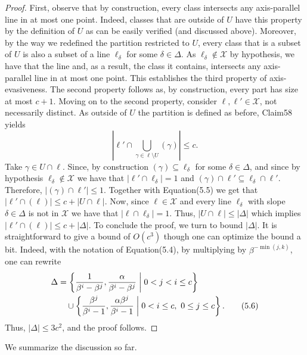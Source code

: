 \documentclass[10pt,a4paper]{article}
\begin{document}
\begin{proof}
First, observe that by construction, every class intersects any axis-parallel line in at most one point. Indeed, classes that are outside of $U$ have this property by the definition of $U$ as can be easily verified (and discussed above). Moreover, by the way we redefined the partition restricted to $U$, every class that is a subset of $U$ is also a subset of a line $\ell_\delta$ for some $\delta\in\Delta$. As $\ell_\delta\notin\mathcal X$ by hypothesis, we have that the line and, as a result, the class it contains, intersects any axis-parallel line in at most one point. This establishes the third property of axis-evasiveness. The second property follows as, by construction, every part has size at most $c+1$.
Moving on to the second property, consider $\ell,\ell'\in\mathcal X$, not necessarily distinct. As outside of $U$ the partition is defined as before, Claim58 yields
\begin{equation}\left|\ell'\cap\bigcup_{\gamma\in\ell\setminus U}(\gamma)\right|\leq c.\tag{5.5}\end{equation}
Take $\gamma\in U\cap\ell$. Since, by construction $(\gamma)\subseteq\ell_\delta$ for some $\delta\in\Delta$, and since by hypothesis $\ell_\delta\notin\mathcal X$ we have that $|\ell'\cap\ell_\delta|=1$ and $(\gamma)\cap\ell'\subseteq\ell_\delta\cap\ell'$. Therefore, $|(\gamma)\cap\ell'|\leq1$. Together with Equation(5.5) we get that $|\ell'\cap(\ell)|\leq c+|U\cap\ell|$. Now, since $\ell\in\mathcal X$ and every line $\ell_\delta$ with slope $\delta\in\Delta$ is not in $\mathcal X$ we have that $|\ell\cap\ell_\delta|=1$. Thus, $|U\cap\ell|\leq|\Delta|$ which implies $|\ell'\cap(\ell)|\leq c+|\Delta|$.
To conclude the proof, we turn to bound $|\Delta|$. It is straightforward to give a bound of $O(c^3)$ though one can optimize the bound a bit. Indeed, with the notation of Equation(5.4), by multiplying by $\beta^{-\min(j,k)}$, one can rewrite
\begin{align}\Delta&=\left\{\frac1{\beta^i-\beta^j},\frac\alpha{\beta^i-\beta^j}\;\middle|\;0<j<i\leq c\right\}\notag\\&\quad\cup\left\{\frac{\beta^j}{\beta^i-1},\frac{\alpha\beta^j}{\beta^i-1}\;\middle|\;0<i\leq c,\ 0\leq j\leq c\right\}.\tag{5.6}\end{align}
Thus, $|\Delta|\leq3c^2$, and the proof follows.
\end{proof}
We summarize the discussion so far.
\end{document}
